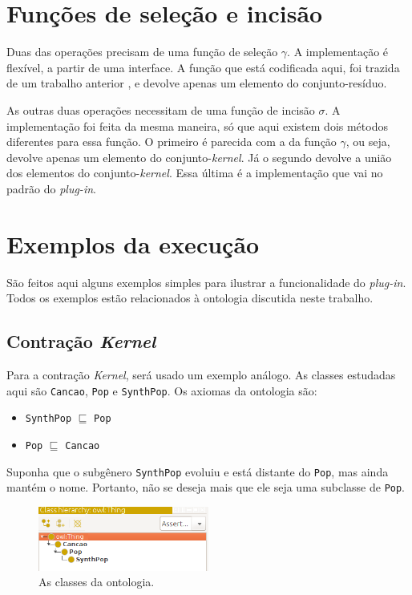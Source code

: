 \section{Funções de seleção e incisão}

Duas das operações precisam de uma função de seleção $ \gamma $. A implementação é flexível, a partir de uma interface. A função que está codificada aqui, foi trazida de um trabalho anterior \citep{logicaMatos}, e devolve apenas um elemento do conjunto-resíduo.

As outras duas operações necessitam de uma função de incisão $ \sigma $. A implementação foi feita da mesma maneira, só que aqui existem dois métodos diferentes para essa função. O primeiro é parecida com a da função $ \gamma $, ou seja, devolve apenas um elemento do conjunto-\textit{kernel}. Já o segundo devolve a união dos elementos do conjunto-\textit{kernel}. Essa última é a im\-ple\-men\-ta\-ção que vai no padrão do \textit{plug-in}.

\section{Exemplos da execução}

São feitos aqui alguns exemplos simples para ilustrar a funcionalidade do \textit{plug-in}. Todos os exemplos estão relacionados à ontologia discutida neste trabalho.

\subsection{Contração \textit{Kernel}}

Para a contração \textit{Kernel}, será usado um exemplo análogo. As classes estudadas aqui são \texttt{Cancao}, \texttt{Pop} e \texttt{SynthPop}. Os axiomas da ontologia são:

\begin{itemize}
	\item \texttt{SynthPop} $ \sqsubseteq $ \texttt{Pop}
	\item \texttt{Pop} $ \sqsubseteq $ \texttt{Cancao}
\end{itemize}

Suponha que o subgênero \texttt{SynthPop} evoluiu e está distante do \texttt{Pop}, mas ainda mantém o nome. Portanto, não se deseja mais que ele seja uma subclasse de \texttt{Pop}.

\begin{figure}[H]
	\centering
	\includegraphics[width=0.5\textwidth]{Capitulos/Implementacao/ck1.png}
	\caption{As classes da ontologia.}
\end{figure}


